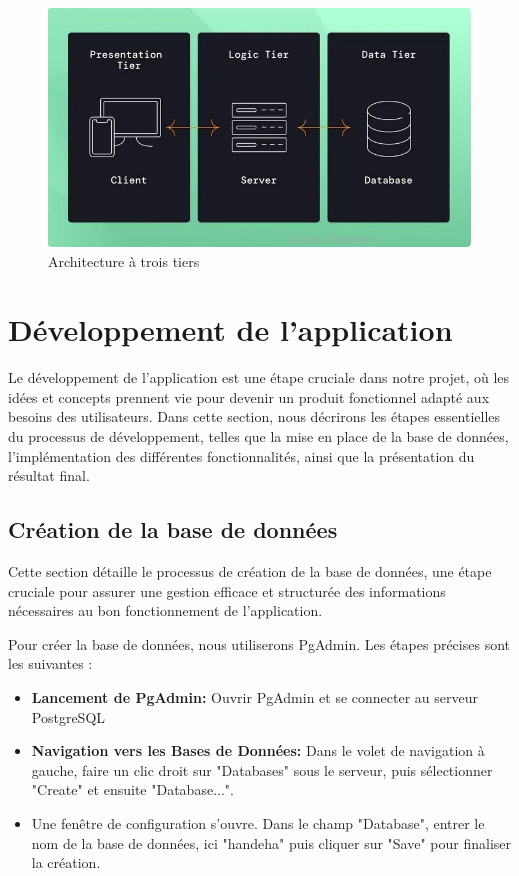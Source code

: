 \documentclass[12pt]{report}
\begin{document}
			\begin{figure}[h]
				\centering
				\includegraphics[width=\textwidth]{archi3T.jpg}
				\caption{Architecture à trois tiers\cite{3Tier}}
				\label{fig:archi3T}
			\end{figure}
			\FloatBarrier


			\chapter{Développement de l’application}


			\hspace{15pt} Le développement de l'application est une étape cruciale dans notre projet, où les idées et concepts prennent vie pour devenir un produit fonctionnel adapté aux besoins des utilisateurs. Dans cette section, nous décrirons les étapes essentielles du processus de développement, telles que la mise en place de la base de données, l'implémentation des différentes fonctionnalités, ainsi que la présentation du résultat final.
		
			\section{Création de la base de données}
			
			\hspace{15pt} Cette section détaille le processus de création de la base de données, une étape cruciale pour assurer une gestion efficace et structurée des informations nécessaires au bon fonctionnement de l'application.

			Pour créer la base de données, nous utiliserons PgAdmin. Les étapes précises sont les suivantes :					

			\begin{itemize}
				\item \textbf{Lancement de PgAdmin:} Ouvrir PgAdmin et se connecter au serveur PostgreSQL
				\item \textbf{Navigation vers les Bases de Données:} Dans le volet de navigation à gauche, faire un clic droit sur "Databases" sous le serveur, puis sélectionner "Create" et ensuite "Database...".
				\item {} Une fenêtre de configuration s'ouvre. Dans le champ "Database", entrer le nom de la base de données, ici "handeha" puis cliquer sur "Save" pour finaliser la création.
			\end{itemize}
\end{document}
